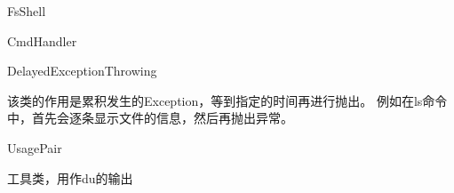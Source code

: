 \begin{XeClass}{FsShell}
\begin{XeInnerClass}{CmdHandler}
  \end{XeInnerClass}
  \begin{XeInnerClass}{DelayedExceptionThrowing}
     
 该类的作用是累积发生的Exception，等到指定的时间再进行抛出。
 例如在ls命令中，首先会逐条显示文件的信息，然后再抛出异常。

  \end{XeInnerClass}
  \begin{XeInnerClass}{UsagePair}
     
 工具类，用作du的输出

  \end{XeInnerClass}
\end{XeClass}
